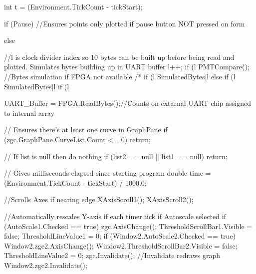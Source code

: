 {{{            int t = (Environment.TickCount - tickStart);

            if (Pause) //Ensures points only plotted if pause button NOT pressed on form
            {

            }
            else
            {
                //l is clock divider index so 10 bytes can be built up before being read and plotted. Simulates bytes building up in UART buffer
                l++;
                if (l %
                {
                    PMTCompare();
                }
                //Bytes simulation if FPGA not available
                /* if (l %
                {
                    SimulatedBytes[l %
                }
                else if (l %
                {
                    SimulatedBytes[l %
                }
                if (l %

                {
                    UART_Buffer = FPGA.ReadBytes();//Counts on extarnal UART chip assigned to internal array

                    // Ensures there's at least one curve in GraphPane
                    if (zgc.GraphPane.CurveList.Count <= 0)
                        return;

                    // If list is null then do nothing
                    if (list2 == null || list1 == null)
                    {
                        return;
                    }

                    // Gives milliseconds elapsed since starting program
                    double time = (Environment.TickCount - tickStart) / 1000.0;

                    //Scrolls Axes if nearing edge
                    XAxisScroll1();
                    XAxisScroll2();

                    //Automatically rescales Y-axis if each timer.tick if Autoscale selected
                    if (AutoScale1.Checked == true)
                    {
                        zgc.AxisChange();
                        ThresholdScrollBar1.Visible = false;
                        ThresholdLineValue1 = 0;
                    }
                    if (Window2.AutoScale2.Checked == true)
                    {
                        Window2.zgc2.AxisChange();
                        Window2.ThresholdScrollBar2.Visible = false;
                        ThresholdLineValue2 = 0;
                    }
                    zgc.Invalidate(); //Invalidate redraws graph
                    Window2.zgc2.Invalidate();

}}}}}
